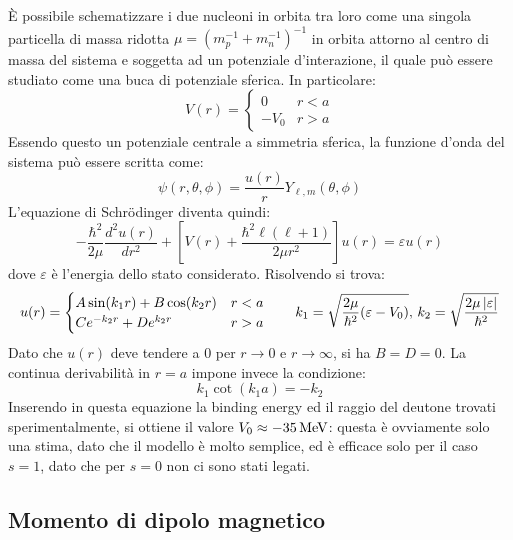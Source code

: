 È possibile schematizzare i due nucleoni in orbita tra loro come una singola particella di massa ridotta $ \mu = (m_p^{-1} + m_n^{-1})^{-1} $ in orbita attorno al centro di massa del sistema e soggetta ad un potenziale d'interazione, il quale può essere studiato come una buca di potenziale sferica. In particolare:
\begin{equation}
	V(r) =
	\begin{cases}
		0 & r < a \\
		-V_0 & r > a
	\end{cases}
	\label{eq:4.6}
\end{equation}
Essendo questo un potenziale centrale a simmetria sferica, la funzione d'onda del sistema può essere scritta come:
\begin{equation}
	\psi(r,\theta,\phi) = \frac{u(r)}{r} Y_{\ell,m}(\theta,\phi)
	\label{eq:4.7}
\end{equation}
L'equazione di Schrödinger diventa quindi:
\begin{equation}
	- \frac{\hbar^2}{2\mu} \frac{d^2 u(r)}{dr^2} + \left[ V(r) + \frac{\hbar^2 \ell (\ell + 1)}{2\mu r^2} \right] u(r) = \varepsilon u(r)
	\label{eq:4.8}
\end{equation}
dove $ \varepsilon $ è l'energia dello stato considerato. Risolvendo si trova:
\begin{equation}
	u(r) =
	\begin{cases}
		A \sin (k_1 r) + B \cos (k_2 r) & r < a \\
		C e^{-k_2 r} + D e^{k_2 r} & r > a
	\end{cases}
	\qquad
	k_1 = \sqrt{\frac{2\mu}{\hbar^2} (\varepsilon - V_0)}, \, k_2 = \sqrt{\frac{2\mu \left\lvert\varepsilon\right\rvert}{\hbar^2}}
	\label{eq:4.9}
\end{equation}
Dato che $ u(r) $ deve tendere a $ 0 $ per $ r \rightarrow 0 $ e $ r \rightarrow \infty $, si ha $ B = D = 0 $. La continua derivabilità in $ r = a $ impone invece la condizione:
\begin{equation}
	k_1 \cot (k_1 a) = - k_2
	\label{eq:4.10}
\end{equation}
Inserendo in questa equazione la binding energy ed il raggio del deutone trovati sperimentalmente, si ottiene il valore $ V_0 \approx -35\,\mathrm{MeV} $: questa è ovviamente solo una stima, dato che il modello è molto semplice, ed è efficace solo per il caso $ s = 1 $, dato che per $ s = 0 $ non ci sono stati legati.

\subsection{Momento di dipolo magnetico}

